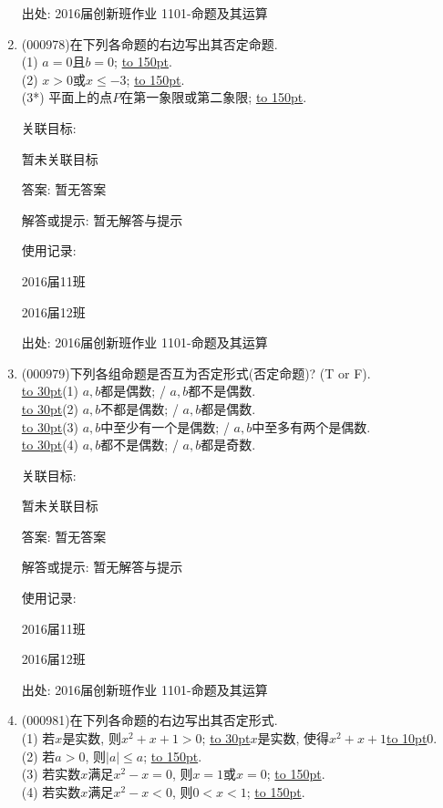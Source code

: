 \documentclass[10pt,a4paper]{article}
\newcommand{\blank}[1]{\underline{\hbox to #1pt{}}}
\begin{document}
\begin{enumerate}[1.]
出处: 2016届创新班作业	1101-命题及其运算
\item { (000978)}在下列各命题的右边写出其否定命题.\\ 
(1) $a=0$且$b=0$; \blank{150}.\\ 
(2) $x>0$或$x \le -3$; \blank{150}.\\ 
(3*) 平面上的点$P$在第一象限或第二象限; \blank{150}.


关联目标:

暂未关联目标

答案: 暂无答案

解答或提示: 暂无解答与提示

使用记录:

2016届11班			

2016届12班			


出处: 2016届创新班作业	1101-命题及其运算
\item { (000979)}下列各组命题是否互为否定形式(否定命题)? (T or F).\\ 
\blank{30}(1) $a,b$都是偶数; / $a,b$都不是偶数.\\ 
\blank{30}(2) $a,b$不都是偶数; / $a,b$都是偶数.\\ 
\blank{30}(3) $a,b$中至少有一个是偶数; / $a,b$中至多有两个是偶数.\\ 
\blank{30}(4) $a,b$都不是偶数; / $a,b$都是奇数.


关联目标:

暂未关联目标

答案: 暂无答案

解答或提示: 暂无解答与提示

使用记录:

2016届11班				

2016届12班				


出处: 2016届创新班作业	1101-命题及其运算
\item { (000981)}在下列各命题的右边写出其否定形式.\\ 
(1) 若$x$是实数, 则$x^2+x+1>0$; \blank{30}$x$是实数, 使得$x^2+x+1$\blank{10}$0$.\\ 
(2) 若$a>0$, 则$|a|\le a$; \blank{150}.\\ 
(3) 若实数$x$满足$x^2-x=0$, 则$x=1$或$x=0$; \blank{150}.\\ 
(4) 若实数$x$满足$x^2-x<0$, 则$0<x<1$; \blank{150}.



\end{enumerate}
\end{document}

